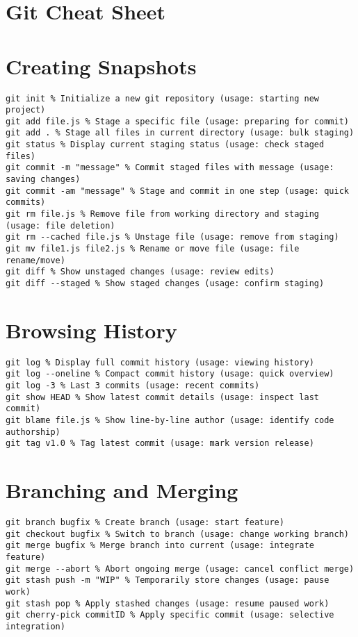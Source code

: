 \documentclass[a4paper,10pt]{article}
\begin{document}
\section*{Git Cheat Sheet}

\section{Creating Snapshots}
\begin{lstlisting}
git init % Initialize a new git repository (usage: starting new project)
git add file.js % Stage a specific file (usage: preparing for commit)
git add . % Stage all files in current directory (usage: bulk staging)
git status % Display current staging status (usage: check staged files)
git commit -m "message" % Commit staged files with message (usage: saving changes)
git commit -am "message" % Stage and commit in one step (usage: quick commits)
git rm file.js % Remove file from working directory and staging (usage: file deletion)
git rm --cached file.js % Unstage file (usage: remove from staging)
git mv file1.js file2.js % Rename or move file (usage: file rename/move)
git diff % Show unstaged changes (usage: review edits)
git diff --staged % Show staged changes (usage: confirm staging)
\end{lstlisting}

\section{Browsing History}
\begin{lstlisting}
git log % Display full commit history (usage: viewing history)
git log --oneline % Compact commit history (usage: quick overview)
git log -3 % Last 3 commits (usage: recent commits)
git show HEAD % Show latest commit details (usage: inspect last commit)
git blame file.js % Show line-by-line author (usage: identify code authorship)
git tag v1.0 % Tag latest commit (usage: mark version release)
\end{lstlisting}

\section{Branching and Merging}
\begin{lstlisting}
git branch bugfix % Create branch (usage: start feature)
git checkout bugfix % Switch to branch (usage: change working branch)
git merge bugfix % Merge branch into current (usage: integrate feature)
git merge --abort % Abort ongoing merge (usage: cancel conflict merge)
git stash push -m "WIP" % Temporarily store changes (usage: pause work)
git stash pop % Apply stashed changes (usage: resume paused work)
git cherry-pick commitID % Apply specific commit (usage: selective integration)
\end{lstlisting}
\end{document}

